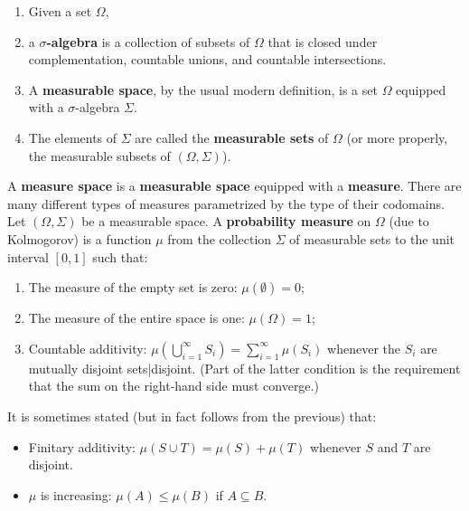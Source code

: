 \begin{frame}
\begin{enumerate}
\item Given a set $\Omega$, 
\item a \textbf{$\sigma$-algebra} is a collection of subsets of $\Omega$ that is closed under complementation, countable unions, and countable intersections. 
\item A \textbf{measurable space}, by the usual modern definition, is a set $\Omega$ equipped with a $\sigma$-algebra $\Sigma$. 
\item The elements of $\Sigma$ are called the \textbf{measurable sets} of $\Omega$ (or more properly, the measurable subsets of $(\Omega,\Sigma)$).
\end{enumerate}
\end{frame}

\begin{frame}
A \textbf{measure space} is a \textbf{measurable space} equipped with a \textbf{measure}. There are many different types of measures parametrized by the type of their codomains. Let $(\Omega, \Sigma)$ be a measurable space. A \textbf{probability measure} on $\Omega$ (due to Kolmogorov) is a function $\mu$ from the collection $\Sigma$ of measurable sets to the unit interval $[0,1]$ such that:

\begin{enumerate}%
\item The measure of the empty set is zero: $\mu(\emptyset) = 0$;
\item The measure of the entire space is one: $\mu(\Omega) = 1$;
\item Countable additivity: $\mu(\bigcup_{i = 1}^{\infty} S_i) = \sum_{i=1}^{\infty} \mu(S_i)$ whenever the $S_i$ are mutually disjoint sets|disjoint.
(Part of the latter condition is the requirement that the sum on the right-hand side must converge.)
\end{enumerate}
\end{frame}

\begin{frame}
It is sometimes stated (but in fact follows from the previous) that:

\begin{itemize}%
\item Finitary additivity: $\mu(S \cup T) = \mu(S) + \mu(T)$ whenever $S$ and $T$ are disjoint.
\item $\mu$ is increasing: $\mu(A) \leq \mu(B)$ if $A \subseteq B$.

\end{itemize}
\end{frame}

